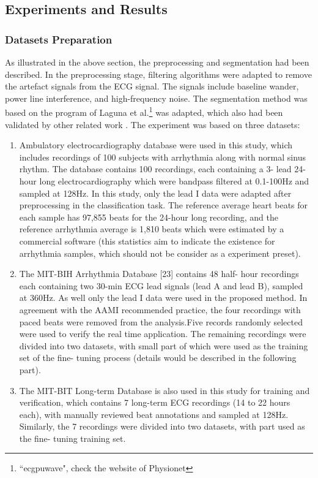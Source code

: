 \documentclass{bmcart}
\begin{document}
\subsection*{Experiments and Results}
\subsubsection*{Datasets Preparation}
As illustrated in the above section, the preprocessing and segmentation had been described. In the preprocessing stage, filtering algorithms were adapted to remove the artefact signals from the ECG signal. The signals include baseline wander, power line interference, and high-frequency noise. The segmentation method was based on the program of Laguna et al.\footnote{``ecgpuwave", check the website of Physionet} was adapted, which also had been validated by other related work \cite{de2004automatic}.
The experiment was based on three datasets:

\begin{enumerate}
\item Ambulatory electrocardiography database were used in this study, which includes recordings of 100 subjects with arrhythmia along with normal sinus rhythm. The database contains 100 recordings, each containing a 3- lead 24-hour long electrocardiography which were bandpass filtered at 0.1-100Hz and sampled at 128Hz. In this study, only the lead I data were adapted after preprocessing in the classification task. The reference average heart beats for each sample has 97,855 beats for the 24-hour long recording, and the reference arrhythmia average is 1,810 beats which were estimated by a commercial software (this statistics aim to indicate the existence for arrhythmia samples, which should not be consider as a experiment preset).

\item The MIT-BIH Arrhythmia Database [23] contains 48 half- hour recordings each containing two 30-min ECG lead signals (lead A and lead B), sampled at 360Hz. As well only the lead I data were used in the proposed method. In agreement with the AAMI recommended practice, the four recordings with paced beats were removed from the analysis.Five records randomly selected were used to verify the real time application. The remaining recordings were divided into two datasets, with small part of which were used as the training set of the fine- tuning process (details would be described in the following part).

\item The MIT-BIT Long-term Database is also used in this study for training and verification, which contains 7 long-term ECG recordings (14 to 22 hours each), with manually reviewed beat annotations and sampled at 128Hz. Similarly, the 7 recordings were divided into two datasets, with part used as the fine- tuning training set. 

\end{enumerate}
\end{document}
